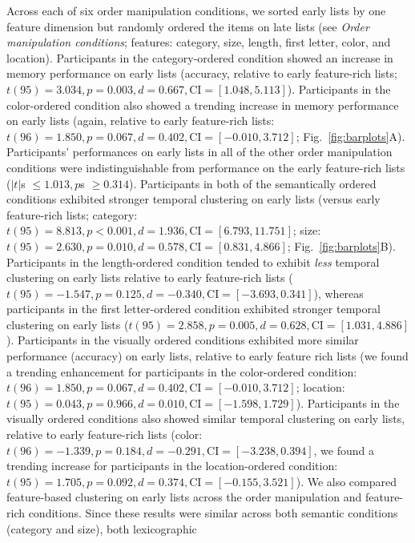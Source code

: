 \documentclass[11pt]{article}
\begin{document}
Across each of six order manipulation conditions, we sorted early lists by one
feature dimension but randomly ordered the items on late lists (see
\textit{Order manipulation conditions}; features: category, size, length, first
letter, color, and location). Participants in the category-ordered condition
showed an increase in memory performance on early lists (accuracy, relative to
early feature-rich lists; $t(95) = 3.034, p = 0.003, d = 0.667, \mathrm{CI} =
[1.048, 5.113]$). Participants in the color-ordered condition also showed a
trending increase in memory performance on early lists (again, relative to
early feature-rich lists: $t(96) = 1.850, p = 0.067, d = 0.402, \mathrm{CI} =
[-0.010, 3.712]$; Fig.~\ref{fig:barplots}A). Participants' performances on
early lists in all of the other order manipulation conditions were
indistinguishable from performance on the early feature-rich lists ($|t|$s
$\leq 1.013, p$s $\geq 0.314$). Participants in both of the semantically
ordered conditions exhibited stronger temporal clustering on early lists
(versus early feature-rich lists; category: $t(95) = 8.813, p < 0.001, d =
1.936, \mathrm{CI} = [6.793, 11.751] $; size: $t(95) = 2.630, p = 0.010, d =
0.578, \mathrm{CI} = [0.831, 4.866]$; Fig.~\ref{fig:barplots}B). Participants
in the length-ordered condition tended to exhibit \textit{less} temporal
clustering on early lists relative to early feature-rich lists ($t(95) =
-1.547, p = 0.125, d = -0.340, \mathrm{CI} = [-3.693, 0.341]$), whereas
participants in the first letter-ordered condition exhibited stronger temporal
clustering on early lists ($t(95) = 2.858, p = 0.005, d = 0.628, \mathrm{CI} =
[1.031, 4.886]$). Participants in the visually ordered conditions exhibited
more similar performance (accuracy) on early lists, relative to early feature
rich lists (we found a trending enhancement for participants in the
color-ordered condition: $t(96) = 1.850, p = 0.067, d = 0.402, \mathrm{CI} =
[-0.010, 3.712]$; location: $t(95) = 0.043, p = 0.966, d = 0.010, \mathrm{CI} =
[-1.598, 1.729]$). Participants in the visually ordered conditions also showed
similar temporal clustering on early lists, relative to early feature-rich
lists (color: $t(96) = -1.339, p = 0.184, d = -0.291, \mathrm{CI} = [-3.238,
0.394]$, we found a trending increase for participants in the location-ordered
condition: $t(95) = 1.705, p = 0.092, d = 0.374, \mathrm{CI} = [-0.155,
3.521]$). We also compared feature-based clustering on early lists across the
order manipulation and feature-rich conditions. Since these results were
similar across both semantic conditions (category and size), both lexicographic
\end{document}
